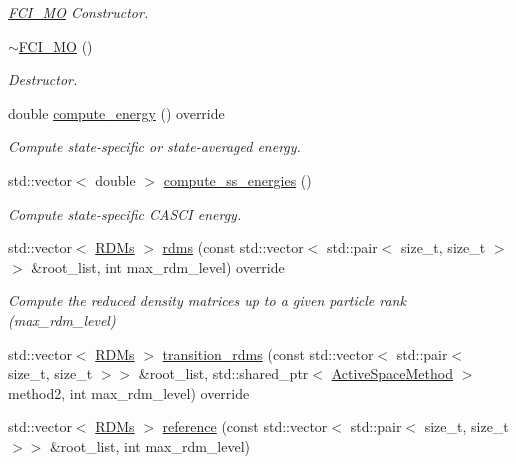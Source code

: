 \begin{DoxyCompactItemize}
\begin{DoxyCompactList}\small\item\em \mbox{\hyperlink{classforte_1_1_f_c_i___m_o}{F\+C\+I\+\_\+\+MO}} Constructor. \end{DoxyCompactList}\item 
\mbox{\hyperlink{classforte_1_1_f_c_i___m_o_ac20d48984c92df007b75971a51aa1990}{$\sim$\+F\+C\+I\+\_\+\+MO}} ()
\begin{DoxyCompactList}\small\item\em Destructor. \end{DoxyCompactList}\item 
double \mbox{\hyperlink{classforte_1_1_f_c_i___m_o_a98d9b947e1cf345c82d513a54ca51ddd}{compute\+\_\+energy}} () override
\begin{DoxyCompactList}\small\item\em Compute state-\/specific or state-\/averaged energy. \end{DoxyCompactList}\item 
std\+::vector$<$ double $>$ \mbox{\hyperlink{classforte_1_1_f_c_i___m_o_adaced1e93bf721e57e828eb612bfdb29}{compute\+\_\+ss\+\_\+energies}} ()
\begin{DoxyCompactList}\small\item\em Compute state-\/specific C\+A\+S\+CI energy. \end{DoxyCompactList}\item 
std\+::vector$<$ \mbox{\hyperlink{classforte_1_1_r_d_ms}{R\+D\+Ms}} $>$ \mbox{\hyperlink{classforte_1_1_f_c_i___m_o_afe4bb6cb53fbf4190c020ee3fa794237}{rdms}} (const std\+::vector$<$ std\+::pair$<$ size\+\_\+t, size\+\_\+t $>$$>$ \&root\+\_\+list, int max\+\_\+rdm\+\_\+level) override
\begin{DoxyCompactList}\small\item\em Compute the reduced density matrices up to a given particle rank (max\+\_\+rdm\+\_\+level) \end{DoxyCompactList}\item 
std\+::vector$<$ \mbox{\hyperlink{classforte_1_1_r_d_ms}{R\+D\+Ms}} $>$ \mbox{\hyperlink{classforte_1_1_f_c_i___m_o_a62d0c9bbee3dc8942ab109354074ad87}{transition\+\_\+rdms}} (const std\+::vector$<$ std\+::pair$<$ size\+\_\+t, size\+\_\+t $>$$>$ \&root\+\_\+list, std\+::shared\+\_\+ptr$<$ \mbox{\hyperlink{classforte_1_1_active_space_method}{Active\+Space\+Method}} $>$ method2, int max\+\_\+rdm\+\_\+level) override
\item 
std\+::vector$<$ \mbox{\hyperlink{classforte_1_1_r_d_ms}{R\+D\+Ms}} $>$ \mbox{\hyperlink{classforte_1_1_f_c_i___m_o_ad4629fe1009af590091c55aecf125314}{reference}} (const std\+::vector$<$ std\+::pair$<$ size\+\_\+t, size\+\_\+t $>$$>$ \&root\+\_\+list, int max\+\_\+rdm\+\_\+level)
$$
\end{DoxyCompactItemize}
